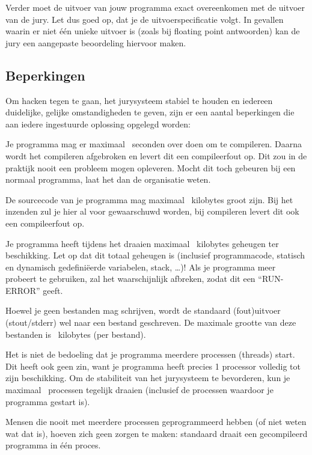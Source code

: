\documentclass[11pt,a4paper]{article}
\begin{document}
Verder moet de uitvoer van jouw programma exact overeenkomen met de
uitvoer van de jury. Let dus goed op, dat je de uitvoerspecificatie
volgt. In gevallen waarin er niet \'e\'en unieke uitvoer is (zoals bij
floating point antwoorden) kan de jury een aangepaste beoordeling
hiervoor maken.

\subsection{Beperkingen}\label{runlimits}

Om hacken tegen te gaan, het jurysysteem stabiel te houden en iedereen
duidelijke, gelijke omstandigheden te geven, zijn er een aantal
beperkingen die aan iedere ingestuurde oplossing opgelegd worden:

\begin{description}
\item[compile-tijd]
Je programma mag er maximaal \COMPILETIME\ seconden over doen om te
compileren. Daarna wordt het compileren afgebroken en levert dit een
compileerfout op. Dit zou in de praktijk nooit een probleem mogen
opleveren. Mocht dit toch gebeuren bij een normaal programma, laat het
dan de organisatie weten.

\item[source grootte]
De sourcecode van je programma mag maximaal \SOURCESIZE\ kilobytes
groot zijn. Bij het inzenden zul je hier al voor gewaarschuwd worden,
bij compileren levert dit ook een compileerfout op.

\item[geheugen]
Je programma heeft tijdens het draaien maximaal \MEMLIMIT\ kilobytes
geheugen ter beschikking. Let op dat dit totaal geheugen is (inclusief
programmacode, statisch en dynamisch gedefini\"eerde variabelen,
stack, \dots)! Als je programma meer probeert te gebruiken, zal het
waarschijnlijk afbreken, zodat dit een ``RUN-ERROR'' geeft.

\item[bestandsgrootte]
Hoewel je geen bestanden mag schrijven, wordt de standaard (fout)uitvoer
(stout/stderr) wel naar een bestand geschreven. De maximale grootte
van deze bestanden is \FILELIMIT\ kilobytes (per bestand).

\item[aantal processen]
Het is niet de bedoeling dat je programma meerdere processen (threads)
start. Dit heeft ook geen zin, want je programma heeft precies 1
processor volledig tot zijn beschikking. Om de stabiliteit van het
jurysysteem te bevorderen, kun je maximaal \PROCLIMIT\ processen
tegelijk draaien (inclusief de processen waardoor je programma
gestart is).

Mensen die nooit met meerdere processen geprogrammeerd hebben (of
niet weten wat dat is), hoeven zich geen zorgen te maken: standaard
draait een gecompileerd programma in \'e\'en proces.

\end{description}
\end{document}
